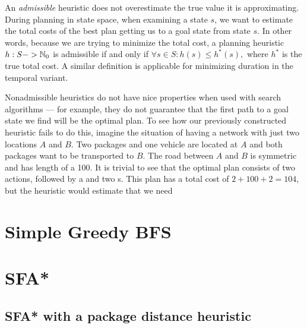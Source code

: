 An \textit{admissible} heuristic does not overestimate
the true value it is approximating. During planning in state space,
when examining a state $s$, we want to estimate the total costs of the best
plan getting us to a goal state from state $s$. In other words, because we are
trying to minimize the total cost,
a planning heuristic $h: S -> \mathbb{N}_0$ is admissible if and only if $\forall s \in S : h(s) \leq h^*(s),$
where $h^*$ is the true total cost. A similar definition is applicable for minimizing duration in the temporal variant.

Nonadmissible heuristics do not have nice properties when used with search algorithms
--- for example, they do not guarantee that the first path to a goal state we find
will be the optimal plan. To see how our previously constructed heuristic fails to do
this, imagine the situation of having a network with just two locations $A$ and $B$.
Two packages and one vehicle are located at $A$ and both packages want to be
transported to $B$. The road between $A$ and $B$ is symmetric and has length
of a 100. It is trivial to see that the optimal plan consists of two \pickup{} actions,
followed by a \drive{} and two \drop{}s. This plan has a total cost of $2+100+2=104$,
but the heuristic would estimate that we need 


\section{Simple Greedy BFS}

 \citep[Section~3.5]{Russell1995}

 \citep{Zhou2015}

\section{SFA*}





\subsection{SFA* with a package distance heuristic}

